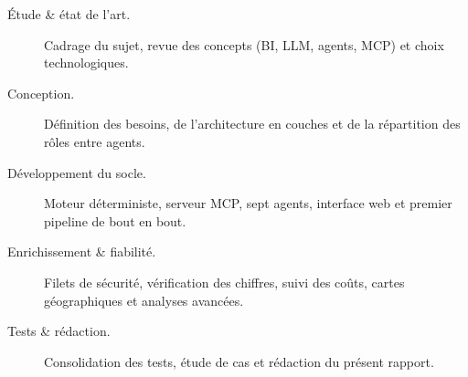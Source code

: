 \begin{description}
  \item[Étude \& état de l'art.] Cadrage du sujet, revue des concepts (BI, LLM,
    agents, MCP) et choix technologiques.
  \item[Conception.] Définition des besoins, de l'architecture en couches et
    de la répartition des rôles entre agents.
  \item[Développement du socle.] Moteur déterministe, serveur MCP, sept agents,
    interface web et premier pipeline de bout en bout.
  \item[Enrichissement \& fiabilité.] Filets de sécurité, vérification des
    chiffres, suivi des coûts, cartes géographiques et analyses avancées.
  \item[Tests \& rédaction.] Consolidation des tests, étude de cas et rédaction
    du présent rapport.
\end{description}

